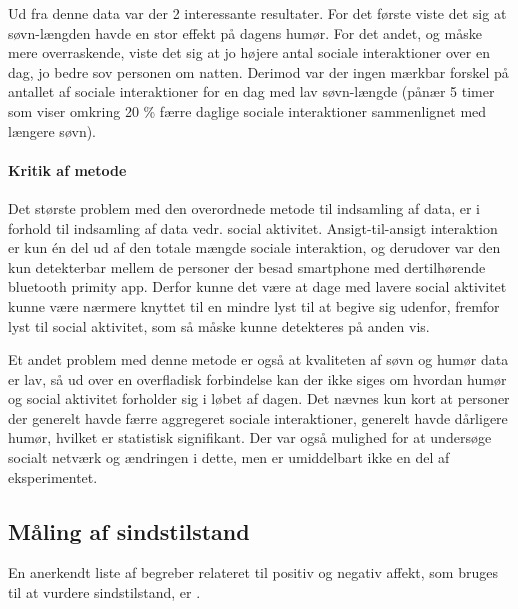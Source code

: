 Ud fra denne data var der 2 interessante resultater.
For det første viste det sig at søvn-længden havde en stor effekt på dagens humør.
For det andet, og måske mere overraskende, viste det sig at jo højere antal sociale interaktioner over en dag, jo bedre sov personen om natten.
Derimod var der ingen mærkbar forskel på antallet af sociale interaktioner for en dag med lav søvn-længde (pånær 5 timer som viser omkring 20 \% færre daglige sociale interaktioner sammenlignet med længere søvn).

\paragraph{Kritik af metode}
Det største problem med den overordnede metode til indsamling af data, er i forhold til indsamling af data vedr. social aktivitet.
Ansigt-til-ansigt interaktion er kun én del ud af den totale mængde sociale interaktion, og derudover var den kun detekterbar mellem de personer der besad smartphone med dertilhørende bluetooth primity app.
Derfor kunne det være at dage med lavere social aktivitet kunne være nærmere knyttet til en mindre lyst til at begive sig udenfor, fremfor lyst til social aktivitet, som så måske kunne detekteres på anden vis.

Et andet problem med denne metode er også at kvaliteten af søvn og humør data er lav, så ud over en overfladisk forbindelse kan der ikke siges om hvordan humør og social aktivitet forholder sig i løbet af dagen.
Det nævnes kun kort at personer der generelt havde færre aggregeret sociale interaktioner, generelt havde dårligere humør, hvilket er statistisk signifikant.
Der var også mulighed for at undersøge socialt netværk og ændringen i dette, men er umiddelbart ikke en del af eksperimentet.

\subsection{Måling af sindstilstand}
En anerkendt liste af begreber relateret til positiv og negativ affekt, som bruges til at vurdere sindstilstand, er \citet{panas}.

